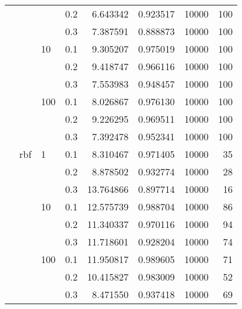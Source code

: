 \begin{table}[H]
\begin{tabular}{llllrrrr}
           &     &     & 0.2 &   6.643342 &  0.923517 &   10000 &   100 \\
           &     &     & 0.3 &   7.387591 &  0.888873 &   10000 &   100 \\
           &     & 10  & 0.1 &   9.305207 &  0.975019 &   10000 &   100 \\
           &     &     & 0.2 &   9.418747 &  0.966116 &   10000 &   100 \\
           &     &     & 0.3 &   7.553983 &  0.948457 &   10000 &   100 \\
           &     & 100 & 0.1 &   8.026867 &  0.976130 &   10000 &   100 \\
           &     &     & 0.2 &   9.226295 &  0.969511 &   10000 &   100 \\
           &     &     & 0.3 &   7.392478 &  0.952341 &   10000 &   100 \\
           & rbf & 1   & 0.1 &   8.310467 &  0.971405 &   10000 &    35 \\
           &     &     & 0.2 &   8.878502 &  0.932774 &   10000 &    28 \\
           &     &     & 0.3 &  13.764866 &  0.897714 &   10000 &    16 \\
           &     & 10  & 0.1 &  12.575739 &  0.988704 &   10000 &    86 \\
           &     &     & 0.2 &  11.340337 &  0.970116 &   10000 &    94 \\
           &     &     & 0.3 &  11.718601 &  0.928204 &   10000 &    74 \\
           &     & 100 & 0.1 &  11.950817 &  0.989605 &   10000 &    71 \\
           &     &     & 0.2 &  10.415827 &  0.983009 &   10000 &    52 \\
           &     &     & 0.3 &   8.471550 &  0.937418 &   10000 &    69 \\
\bottomrule
\end{tabular}
\end{table}
